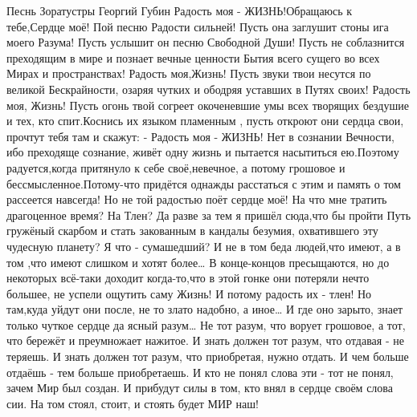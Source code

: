 Песнь Зоратустры
Георгий Губин
Радость моя - ЖИЗНЬ!Обращаюсь к тебе,Сердце моё! Пой песню Радости сильней! Пусть она заглушит стоны ига моего Разума! Пусть услышит он песню Свободной Души! Пусть не соблазнится преходящим в мире и познает вечные ценности Бытия всего сущего во всех Мирах и пространствах!
 Радость моя,Жизнь! Пусть звуки твои несутся по великой Бескрайности, озаряя чутких и ободряя уставших в Путях своих!
 Радость моя, Жизнь! Пусть огонь твой согреет окоченевшие умы всех творящих бездушие и тех, кто спит.Коснись их языком пламенным , пусть откроют они сердца свои, прочтут тебя там и скажут: - Радость моя - ЖИЗНЬ!
Нет в сознании Вечности, ибо преходяще сознание, живёт одну жизнь и пытается насытиться ею.Поэтому радуется,когда притянуло к себе своё,невечное, а потому грошовое и бессмысленное.Потому-что придётся однажды расстаться с этим и  память о том рассеется навсегда! Но не той радостью поёт сердце моё!
На что мне тратить драгоценное время? На Тлен? Да разве за тем я пришёл сюда,что бы пройти Путь гружёный скарбом и стать закованным в кандалы безумия, охватившего эту чудесную планету? Я что - сумашедший?
И не в том беда людей,что имеют, а в том ,что имеют слишком и хотят более… В конце-концов пресыщаются, но до некоторых всё-таки доходит когда-то,что в этой гонке они потеряли нечто большее, не успели ощутить саму Жизнь! И потому радость их - тлен!
Но там,куда уйдут они после, не то злато надобно, а иное… И где оно зарыто, знает только чуткое сердце да ясный разум…
Не тот разум, что ворует грошовое, а тот, что бережёт и преумножает нажитое.
И знать должен тот разум, что отдавая - не теряешь. И знать должен тот разум, что приобретая, нужно отдать. И чем больше отдаёшь - тем больше приобретаешь. И кто не понял слова эти - тот не понял, зачем Мир был создан. И прибудут силы в том, кто внял в сердце своём слова сии. На том стоял, стоит, и стоять будет МИР наш!